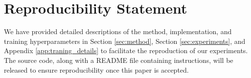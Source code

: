 
\section*{Reproducibility Statement}
\label{sec:reproducibility}

We have provided detailed descriptions of the method, implementation, and training hyperparameters in Section \ref{sec:method}, Section \ref{sec:experiments}, and Appendix \ref{app:traning_details} to facilitate the reproduction of our experiments.
The source code, along with a README file containing instructions, will be released to ensure reproducibility once this paper is accepted.
